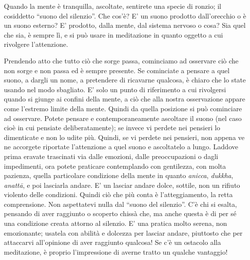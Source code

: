 
Quando la mente è tranquilla, ascoltate, sentirete una specie di ronzio;
il cosiddetto ``suono del silenzio''. Che cos'è? E' un suono prodotto
dall'orecchio o è un suono esterno? E' prodotto, dalla mente, dal
sistema nervoso o cosa? Sia quel che sia, è sempre lì, e si può usare in
meditazione in quanto oggetto a cui rivolgere l'attenzione.

Prendendo atto che tutto ciò che sorge passa, cominciamo ad osservare
ciò che non sorge e non passa ed è sempre presente. Se cominciate a
pensare a quel suono, a dargli un nome, a pretendere di ricavarne
qualcosa, è chiaro che lo state usando nel modo sbagliato. E' solo un
punto di riferimento a cui rivolgersi quando si giunge ai confini della
mente, a ciò che alla nostra osservazione appare come l'estremo limite
della mente. Quindi da quella posizione si può cominciare ad osservare.
Potete pensare e contemporaneamente ascoltare il suono (nel caso cioè in
cui pensiate deliberatamente); se invece vi perdete nei pensieri lo
dimenticate e non lo udite più. Quindi, se vi perdete nei pensieri, non
appena ve ne accorgete riportate l'attenzione a quel suono e ascoltatelo
a lungo. Laddove prima eravate trascinati via dalle emozioni, dalle
preoccupazioni o dagli impedimenti, ora potete praticare contemplando
con gentilezza, con molta pazienza, quella particolare condizione della
mente in quanto \textit{anicca}, \textit{dukkha}, \textit{anattā}, e poi lasciarla andare. E' un
lasciar andare dolce, sottile, non un rifiuto violento delle condizioni.
Quindi ciò che più conta è l'atteggiamento, la retta comprensione. Non
aspettatevi nulla dal ``suono del silenzio”. C'è chi si esalta, pensando
di aver raggiunto o scoperto chissà che, ma anche questa è di per sé una
condizione creata attorno al silenzio. E' una pratica molto serena, non
emozionante; usatela con abilità e dolcezza per lasciar andare,
piuttosto che per attaccarvi all'opinione di aver raggiunto qualcosa! Se
c'è un ostacolo alla meditazione, è proprio l'impressione di averne
tratto un qualche vantaggio!

